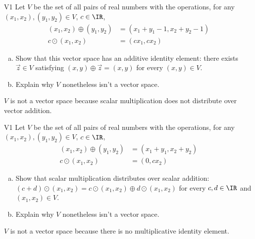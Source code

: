 \begin{problem}{V1}
Let \(V\) be the set of all pairs of real numbers with the operations, for any \((x_1,x_2), (y_1,y_2) \in V\), \(c\in \IR\),
\begin{align*}
(x_1,x_2) \oplus (y_1,y_2) &= (x_1+y_1-1,x_2+y_2-1) \\
c \odot (x_1,x_2) &= (cx_1, cx_2)
\end{align*}
\begin{enumerate}[(a)]
\item Show that this vector space has an additive identity element:
      there exists \(\vec{z} \in V\) satisfying \((x,y)\oplus\vec{z}=(x,y)\) for every \((x,y) \in V\).
\item Explain why \(V\) nonetheless isn't a vector space.
\end{enumerate}
\end{problem}
\begin{solution}
$V$ is not a vector space because scalar multiplication does not distribute over vector addition.
\end{solution}

\begin{problem}{V1}
Let \(V\) be the set of all pairs of real numbers with the operations, for any \((x_1,x_2), (y_1,y_2) \in V\), \(c\in \IR\),
\begin{align*}
(x_1,x_2) \oplus (y_1,y_2) &= (x_1+y_1,x_2+y_2) \\
c \odot (x_1,x_2) &= (0, cx_2)
\end{align*}
\begin{enumerate}[(a)]
\item Show that scalar multiplication distributes over scalar addition:
      \((c+d)\odot(x_1,x_2)=c\odot(x_1,x_2) \oplus d\odot(x_1,x_2)\) for every \(c,d \in \IR\) and \( (x_1,x_2) \in V\).
\item Explain why \(V\) nonetheless isn't a vector space.
\end{enumerate}
\end{problem}
\begin{solution}
\(V\) is not a vector space because there is no multiplicative identity element.
\end{solution}


